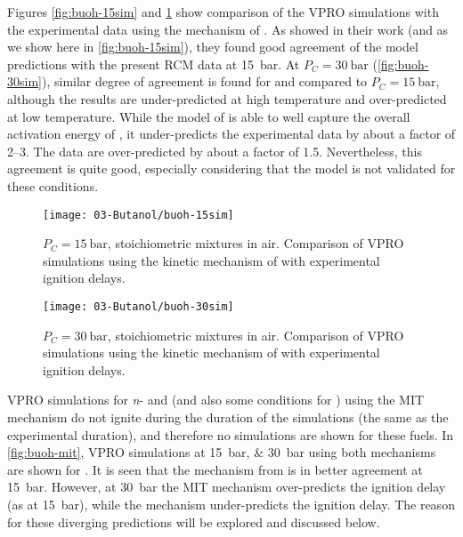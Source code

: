 \documentclass[12pt, letterpaper]{article}
\begin{document}
Figures \ref{fig:buoh-15sim} and \ref{fig:buoh-30sim} show comparison of the
VPRO simulations with the experimental data using the mechanism of
\textcite{Sarathy2012}. As \textcite{Sarathy2012} showed in their work (and as
we show here in \autoref{fig:buoh-15sim}), they found good agreement of the
model predictions with the present RCM data at \SI{15}{\bar}. At $P_C=\SI{30}{\bar}$
(\autoref{fig:buoh-30sim}), similar degree of agreement is found for
\tBuOH{} and \sBuOH{} compared to $P_C=\SI{15}{\bar}$, although
the \sBuOH{} results are under-predicted at high temperature and
over-predicted at low temperature. While the model of \textcite{Sarathy2012} is
able to well capture the overall activation energy of \iBuOH{}, it
under-predicts the experimental data by about a factor of \numrange{2}{3}. The
\nBuOH{} data are over-predicted by about a factor of 1.5.
Nevertheless, this agreement is quite good, especially considering that the
model is not validated for these conditions.

\begin{figure}
    \begin{floatrow}
    \ffigbox
        {\texttt{[image: 03-Butanol/buoh-15sim]}}
        {\caption{$P_C=\SI{15}{\bar}$, stoichiometric mixtures in air. Comparison of
            VPRO simulations using the kinetic mechanism of
            \textcite{Sarathy2012} with experimental ignition delays.}
        \label{fig:buoh-15sim}}
    \ffigbox
        {\texttt{[image: 03-Butanol/buoh-30sim]}}
        {\caption{$P_C=\SI{30}{\bar}$, stoichiometric mixtures in air. Comparison of
            VPRO simulations using the kinetic mechanism of
            \textcite{Sarathy2012} with experimental ignition delays.}
        \label{fig:buoh-30sim}}
    \end{floatrow}
\end{figure}

VPRO simulations for \textit{n}- and \sBuOH{} (and also some
conditions for \tBuOH{}) using the MIT mechanism
\cite{Hansen2013,Merchant2013} do not ignite during the duration of the
simulations (the same as the experimental duration), and therefore no
simulations are shown for these fuels. In \autoref{fig:buoh-mit}, VPRO
simulations at \SIlist{15;30}{\bar} using both mechanisms are shown for
\iBuOH{}. It is seen that the mechanism from \textcite{Sarathy2012}
is in better agreement at \SI{15}{\bar}. However, at \SI{30}{\bar} the MIT mechanism
\cite{Hansen2013,Merchant2013} over-predicts the ignition delay (as at \SI{15}{\bar}),
while the \textcite{Sarathy2012} mechanism under-predicts the ignition delay.
The reason for these diverging predictions will be explored and discussed below.
\end{document}
